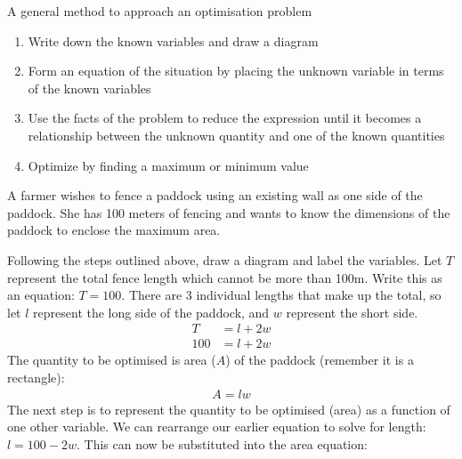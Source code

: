 \begin{tcolorbox}
	A general method to approach an optimisation problem
	\begin{enumerate}
		\item Write down the known variables and draw a diagram
		\item Form an equation of the situation by placing the unknown variable in terms of the known variables
		\item Use the facts of the problem to reduce the expression until it becomes a relationship between the unknown quantity and one of the known quantities
		\item Optimize by finding a maximum or minimum value
	\end{enumerate}
\end{tcolorbox}

\example A farmer wishes to fence a paddock using an existing wall as one side of the paddock. She has 100 meters of fencing and wants to know the dimensions of the paddock to enclose the maximum area.
\begin{center}
\end{center}
\solution Following the steps outlined above, draw a diagram and label the variables. Let $T$ represent the total fence length which cannot be more than 100m. Write this as an equation: $T=100$. There are 3 individual lengths that make up the total, so let $l$ represent the long side of the paddock, and $w$ represent the short side.
\begin{align*}
T&=l+2w\\
100&=l+2w
\end{align*}
The quantity to be optimised is area ($A$) of the paddock (remember it is a rectangle):
\begin{align*}
A=lw
\end{align*}
The next step is to represent the quantity to be optimised (area) as a function of one other variable. We can rearrange our earlier equation to solve for length: $l=100-2w$. This can now be substituted into the area equation:
